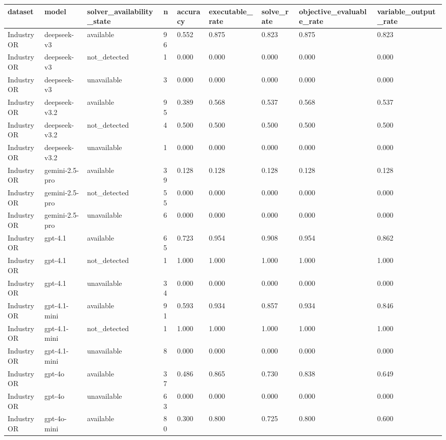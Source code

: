 \begin{table}[t]
\centering
\small
\begin{tabular}{lllllllll}
\toprule
dataset & model & solver\_availability\_state & n & accuracy & executable\_rate & solve\_rate & objective\_evaluable\_rate & variable\_output\_rate \\
\midrule
IndustryOR & deepseek-v3 & available & 96 & 0.552 & 0.875 & 0.823 & 0.875 & 0.823 \\
IndustryOR & deepseek-v3 & not\_detected & 1 & 0.000 & 0.000 & 0.000 & 0.000 & 0.000 \\
IndustryOR & deepseek-v3 & unavailable & 3 & 0.000 & 0.000 & 0.000 & 0.000 & 0.000 \\
IndustryOR & deepseek-v3.2 & available & 95 & 0.389 & 0.568 & 0.537 & 0.568 & 0.537 \\
IndustryOR & deepseek-v3.2 & not\_detected & 4 & 0.500 & 0.500 & 0.500 & 0.500 & 0.500 \\
IndustryOR & deepseek-v3.2 & unavailable & 1 & 0.000 & 0.000 & 0.000 & 0.000 & 0.000 \\
IndustryOR & gemini-2.5-pro & available & 39 & 0.128 & 0.128 & 0.128 & 0.128 & 0.128 \\
IndustryOR & gemini-2.5-pro & not\_detected & 55 & 0.000 & 0.000 & 0.000 & 0.000 & 0.000 \\
IndustryOR & gemini-2.5-pro & unavailable & 6 & 0.000 & 0.000 & 0.000 & 0.000 & 0.000 \\
IndustryOR & gpt-4.1 & available & 65 & 0.723 & 0.954 & 0.908 & 0.954 & 0.862 \\
IndustryOR & gpt-4.1 & not\_detected & 1 & 1.000 & 1.000 & 1.000 & 1.000 & 1.000 \\
IndustryOR & gpt-4.1 & unavailable & 34 & 0.000 & 0.000 & 0.000 & 0.000 & 0.000 \\
IndustryOR & gpt-4.1-mini & available & 91 & 0.593 & 0.934 & 0.857 & 0.934 & 0.846 \\
IndustryOR & gpt-4.1-mini & not\_detected & 1 & 1.000 & 1.000 & 1.000 & 1.000 & 1.000 \\
IndustryOR & gpt-4.1-mini & unavailable & 8 & 0.000 & 0.000 & 0.000 & 0.000 & 0.000 \\
IndustryOR & gpt-4o & available & 37 & 0.486 & 0.865 & 0.730 & 0.838 & 0.649 \\
IndustryOR & gpt-4o & unavailable & 63 & 0.000 & 0.000 & 0.000 & 0.000 & 0.000 \\
IndustryOR & gpt-4o-mini & available & 80 & 0.300 & 0.800 & 0.725 & 0.800 & 0.600 \\

\end{tabular}
\end{table}
